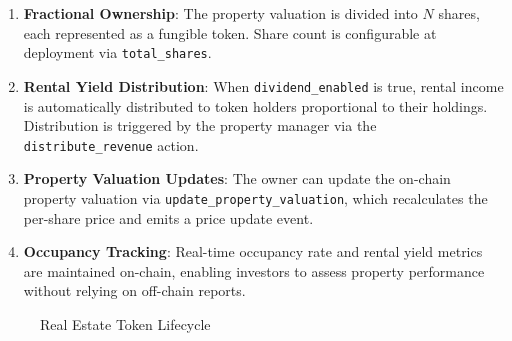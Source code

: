 \documentclass[11pt,a4paper,twoside]{article}
\begin{document}
\begin{enumerate}[label=\textbf{(\alph*)}]
  \item \textbf{Fractional Ownership}: The property valuation is divided into $N$ shares, each represented as a fungible token. Share count is configurable at deployment via \texttt{total\_shares}.

  \item \textbf{Rental Yield Distribution}: When \texttt{dividend\_enabled} is true, rental income is automatically distributed to token holders proportional to their holdings. Distribution is triggered by the property manager via the \texttt{distribute\_revenue} action.

  \item \textbf{Property Valuation Updates}: The owner can update the on-chain property valuation via \texttt{update\_property\_valuation}, which recalculates the per-share price and emits a price update event.

  \item \textbf{Occupancy Tracking}: Real-time occupancy rate and rental yield metrics are maintained on-chain, enabling investors to assess property performance without relying on off-chain reports.
\end{enumerate}

\begin{figure}[H]
\centering
{}
\caption{Real Estate Token Lifecycle}
\label{fig:real-estate-lifecycle}
\end{figure}
\end{document}
